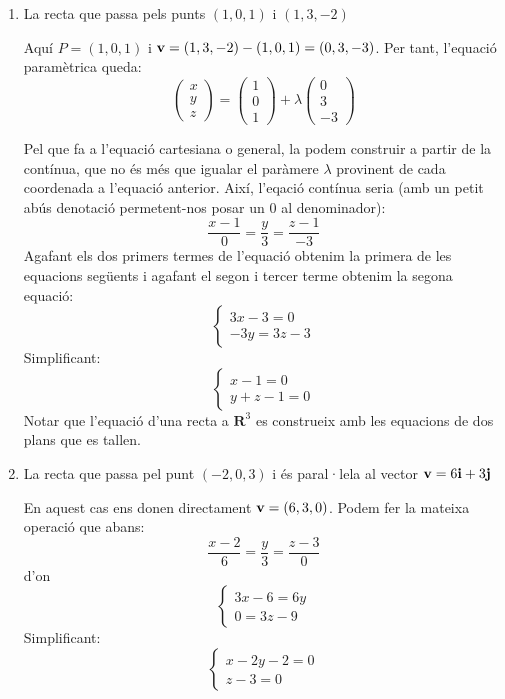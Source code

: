 \begin{enumerate}
  \item La recta que passa pels punts $(1,0,1)$ i $(1,3,-2)$

  Aquí $P=(1,0,1)$ i $\textbf{v}=(1,3,-2)-(1,0,1)=(0,3,-3)$. Per tant, l'equació paramètrica queda:
  \[
  \begin{pmatrix}x\\y\\z\end{pmatrix}= \begin{pmatrix}1\\0\\1\end{pmatrix}+\lambda\begin{pmatrix}0\\3\\-3\end{pmatrix}
  \]

  Pel que fa a l'equació cartesiana o general, la podem construir a partir de la contínua, que no és més que igualar el paràmere $\lambda$ provinent de cada coordenada a l'equació anterior. Així, l'eqació contínua seria (amb un petit abús denotació permetent-nos posar un $0$ al denominador):
  \[
  \frac{x-1}{0}=\frac{y}{3}=\frac{z-1}{-3}
  \]
  Agafant els dos primers termes de l'equació obtenim la primera de les equacions següents i agafant el segon i tercer terme obtenim la segona equació:
  \[
  \begin{cases}3x-3=0\\-3y=3z-3\end{cases}
  \]
  Simplificant:
  \[
  \begin{cases}x-1=0\\y+z-1=0\end{cases}
  \]
  Notar que l'equació d'una recta a $\mathbf{R}^3$ es construeix amb les equacions de dos plans que es tallen.

  \item La recta que passa pel punt $(-2,0,3)$ i és paral·lela al vector $\textbf{v}=6\textbf{i}+3\textbf{j}$

    En aquest cas ens donen directament $\textbf{v}=(6,3,0)$. Podem fer la mateixa operació que abans:
    \[
    \frac{x-2}{6}=\frac{y}{3}=\frac{z-3}{0}
    \]
    d'on
    \[
    \begin{cases}3x-6=6y\\0=3z-9\end{cases}
    \]
    Simplificant:
    \[
    \begin{cases}x-2y-2=0\\z-3=0\end{cases}
    \]


\end{enumerate}
